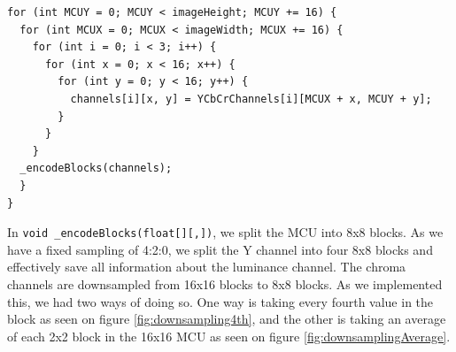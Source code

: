 \begin{lstlisting}[firstnumber=540, label=JPEGEncodeAndQuantize, caption={Shows how the image is divided into MCUs \textbf{File: }JPEGImage.cs}]
for (int MCUY = 0; MCUY < imageHeight; MCUY += 16) {
  for (int MCUX = 0; MCUX < imageWidth; MCUX += 16) {
    for (int i = 0; i < 3; i++) {
      for (int x = 0; x < 16; x++) {
        for (int y = 0; y < 16; y++) {
          channels[i][x, y] = YCbCrChannels[i][MCUX + x, MCUY + y];
        }
      }
    }
  _encodeBlocks(channels);
  }
}
\end{lstlisting}

In \lstinline|void _encodeBlocks(float[][,])|, we split the MCU into 8x8 blocks.
As we have a fixed sampling of 4:2:0, we split the Y channel into four 8x8 blocks and effectively save all information about the luminance channel. The chroma channels are downsampled from 16x16 blocks to 8x8 blocks.
As we implemented this, we had two ways of doing so.
One way is taking every fourth value in the block as seen on figure \ref{fig:downsampling4th}, and the other is taking an average of each 2x2 block in the 16x16 MCU as seen on figure \ref{fig:downsamplingAverage}.

